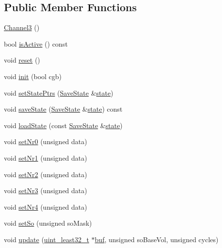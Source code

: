 \subsection*{Public Member Functions}
\begin{DoxyCompactItemize}
\item 
\hyperlink{classgambatte_1_1Channel3_a9c7d0995ebc9f8d6ff78e97136723588}{Channel3} ()
\item 
bool \hyperlink{classgambatte_1_1Channel3_a8c90742b546acc34949544dfdc5e3a06}{is\+Active} () const
\item 
void \hyperlink{classgambatte_1_1Channel3_a2b249e82410f1a623835328e27b52c0f}{reset} ()
\item 
void \hyperlink{classgambatte_1_1Channel3_a960fd026f9cc424f495f4c3557b17c38}{init} (bool cgb)
\item 
void \hyperlink{classgambatte_1_1Channel3_a4e5c1b827c38e28362cd736a12cd1324}{set\+State\+Ptrs} (\hyperlink{structgambatte_1_1SaveState}{Save\+State} \&\hyperlink{ppu_8cpp_a2f2eca6997ee7baf8901725ae074d45b}{state})
\item 
void \hyperlink{classgambatte_1_1Channel3_a3a1442523f6196ad8e031445e5b46256}{save\+State} (\hyperlink{structgambatte_1_1SaveState}{Save\+State} \&\hyperlink{ppu_8cpp_a2f2eca6997ee7baf8901725ae074d45b}{state}) const
\item 
void \hyperlink{classgambatte_1_1Channel3_aaa317622a29cb8e71cdce44178961839}{load\+State} (const \hyperlink{structgambatte_1_1SaveState}{Save\+State} \&\hyperlink{ppu_8cpp_a2f2eca6997ee7baf8901725ae074d45b}{state})
\item 
void \hyperlink{classgambatte_1_1Channel3_ac54d37c29e7a35ab2394fe185f796758}{set\+Nr0} (unsigned data)
\item 
void \hyperlink{classgambatte_1_1Channel3_a4530b1049b8ba6e64c761a286b605f6f}{set\+Nr1} (unsigned data)
\item 
void \hyperlink{classgambatte_1_1Channel3_abf6fece5005b23c8accc5a6f9af62a39}{set\+Nr2} (unsigned data)
\item 
void \hyperlink{classgambatte_1_1Channel3_a7e992093a461b59d1ca4922788f94823}{set\+Nr3} (unsigned data)
\item 
void \hyperlink{classgambatte_1_1Channel3_aab1312c2b2883934096d1a274bf118c4}{set\+Nr4} (unsigned data)
\item 
void \hyperlink{classgambatte_1_1Channel3_a8d95b16d980a90f284ea05c650a53212}{set\+So} (unsigned so\+Mask)
\item 
void \hyperlink{classgambatte_1_1Channel3_a2d3d845741694ae103cb7d60d87dbeb5}{update} (\hyperlink{namespacegambatte_a0639f09fccfbbd5a8e0796318768e370}{uint\+\_\+least32\+\_\+t} $\ast$\hyperlink{ioapi_8h_a8ad8a13c88886b9f623034ff88570adb}{buf}, unsigned so\+Base\+Vol, unsigned cycles)

\end{DoxyCompactItemize}
